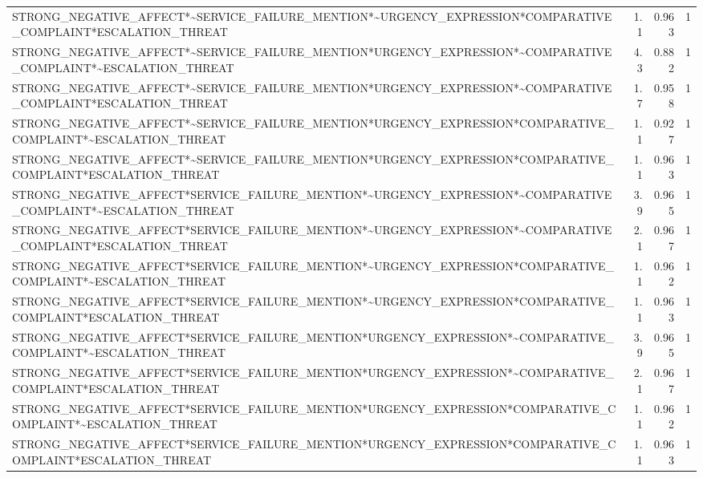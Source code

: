 \documentclass[12pt,a4paper]{article}
\begin{document}
\begin{longtable}{lrrr}
    STRONG\_NEGATIVE\_AFFECT*\textasciitilde{}SERVICE\_FAILURE\_MENTION*\textasciitilde{}URGENCY\_EXPRESSION*COMPARATIVE\_COMPLAINT*ESCALATION\_THREAT & 1.1 & 0.963 & 1 \\
    STRONG\_NEGATIVE\_AFFECT*\textasciitilde{}SERVICE\_FAILURE\_MENTION*URGENCY\_EXPRESSION*\textasciitilde{}COMPARATIVE\_COMPLAINT*\textasciitilde{}ESCALATION\_THREAT & 4.3 & 0.882 & 1 \\
    STRONG\_NEGATIVE\_AFFECT*\textasciitilde{}SERVICE\_FAILURE\_MENTION*URGENCY\_EXPRESSION*\textasciitilde{}COMPARATIVE\_COMPLAINT*ESCALATION\_THREAT & 1.7 & 0.958 & 1 \\
    STRONG\_NEGATIVE\_AFFECT*\textasciitilde{}SERVICE\_FAILURE\_MENTION*URGENCY\_EXPRESSION*COMPARATIVE\_COMPLAINT*\textasciitilde{}ESCALATION\_THREAT & 1.1 & 0.927 & 1 \\
    STRONG\_NEGATIVE\_AFFECT*\textasciitilde{}SERVICE\_FAILURE\_MENTION*URGENCY\_EXPRESSION*COMPARATIVE\_COMPLAINT*ESCALATION\_THREAT & 1.1 & 0.963 & 1 \\
    STRONG\_NEGATIVE\_AFFECT*SERVICE\_FAILURE\_MENTION*\textasciitilde{}URGENCY\_EXPRESSION*\textasciitilde{}COMPARATIVE\_COMPLAINT*\textasciitilde{}ESCALATION\_THREAT & 3.9 & 0.965 & 1 \\
    STRONG\_NEGATIVE\_AFFECT*SERVICE\_FAILURE\_MENTION*\textasciitilde{}URGENCY\_EXPRESSION*\textasciitilde{}COMPARATIVE\_COMPLAINT*ESCALATION\_THREAT & 2.1 & 0.967 & 1 \\
    STRONG\_NEGATIVE\_AFFECT*SERVICE\_FAILURE\_MENTION*\textasciitilde{}URGENCY\_EXPRESSION*COMPARATIVE\_COMPLAINT*\textasciitilde{}ESCALATION\_THREAT & 1.1 & 0.962 & 1 \\
    STRONG\_NEGATIVE\_AFFECT*SERVICE\_FAILURE\_MENTION*\textasciitilde{}URGENCY\_EXPRESSION*COMPARATIVE\_COMPLAINT*ESCALATION\_THREAT & 1.1 & 0.963 & 1 \\
    STRONG\_NEGATIVE\_AFFECT*SERVICE\_FAILURE\_MENTION*URGENCY\_EXPRESSION*\textasciitilde{}COMPARATIVE\_COMPLAINT*\textasciitilde{}ESCALATION\_THREAT & 3.9 & 0.965 & 1 \\
    STRONG\_NEGATIVE\_AFFECT*SERVICE\_FAILURE\_MENTION*URGENCY\_EXPRESSION*\textasciitilde{}COMPARATIVE\_COMPLAINT*ESCALATION\_THREAT & 2.1 & 0.967 & 1 \\
    STRONG\_NEGATIVE\_AFFECT*SERVICE\_FAILURE\_MENTION*URGENCY\_EXPRESSION*COMPARATIVE\_COMPLAINT*\textasciitilde{}ESCALATION\_THREAT & 1.1 & 0.962 & 1 \\
    STRONG\_NEGATIVE\_AFFECT*SERVICE\_FAILURE\_MENTION*URGENCY\_EXPRESSION*COMPARATIVE\_COMPLAINT*ESCALATION\_THREAT & 1.1 & 0.963 & 1 \\
\bottomrule
\end{longtable}
\end{document}
